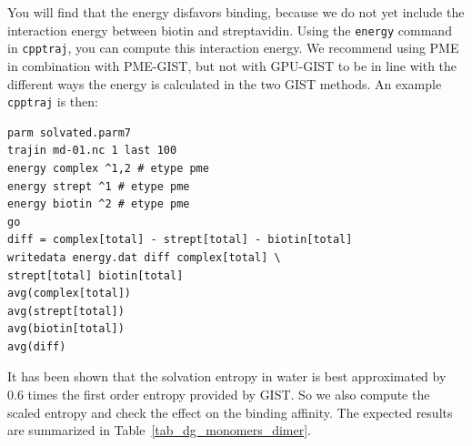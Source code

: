 \documentclass[9pt,tutorial]{livecoms}
\newcommand{\software}{\texttt}
\newcommand\inlinecode{\texttt}
\begin{document}
You will find that the energy disfavors binding, because we do not yet include the interaction energy between biotin and streptavidin.
Using the \inlinecode{energy} command in \software{cpptraj}, you can compute this interaction energy.
We recommend using PME in combination with PME-GIST, but not with GPU-GIST to be in line with the different ways the energy is calculated in the two GIST methods.
An example \software{cpptraj} is then:
\begin{lstlisting}[style=cpptraj]
parm solvated.parm7
trajin md-01.nc 1 last 100
energy complex ^1,2 # etype pme
energy strept ^1 # etype pme
energy biotin ^2 # etype pme
go
diff = complex[total] - strept[total] - biotin[total]
writedata energy.dat diff complex[total] \
strept[total] biotin[total]
avg(complex[total])
avg(strept[total])
avg(biotin[total])
avg(diff)
\end{lstlisting}
It has been shown \cite{Chen2021,Waibl2022-gist-solvents} that the solvation entropy in water is best approximated by 0.6 times the first order entropy provided by GIST.
So we also compute the scaled entropy and check the effect on the binding affinity.
The expected results are summarized in Table~\ref{tab_dg_monomers_dimer}.
\end{document}
